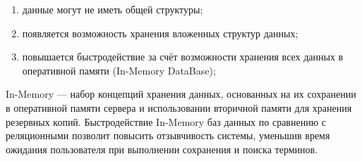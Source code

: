 \begin{enumerate}[label*=\arabic*)]
	\item данные могут не иметь общей структуры;
	\item появляется возможность хранения вложенных структур данных;
	\item повышается быстродействие за счёт возможности хранения всех данных в оперативной памяти (In-Memory DataBase);
	
\end{enumerate}

In-Memory --- набор концепций хранения данных, основанных на их сохранении в оперативной памяти сервера и использовании вторичной памяти для хранения резервных копий. Быстродействие In-Memory баз данных по сравнению с реляционными позволит повысить отзывчивость системы, уменьшив время ожидания пользователя при выполнении сохранения и поиска терминов.



\pagebreak